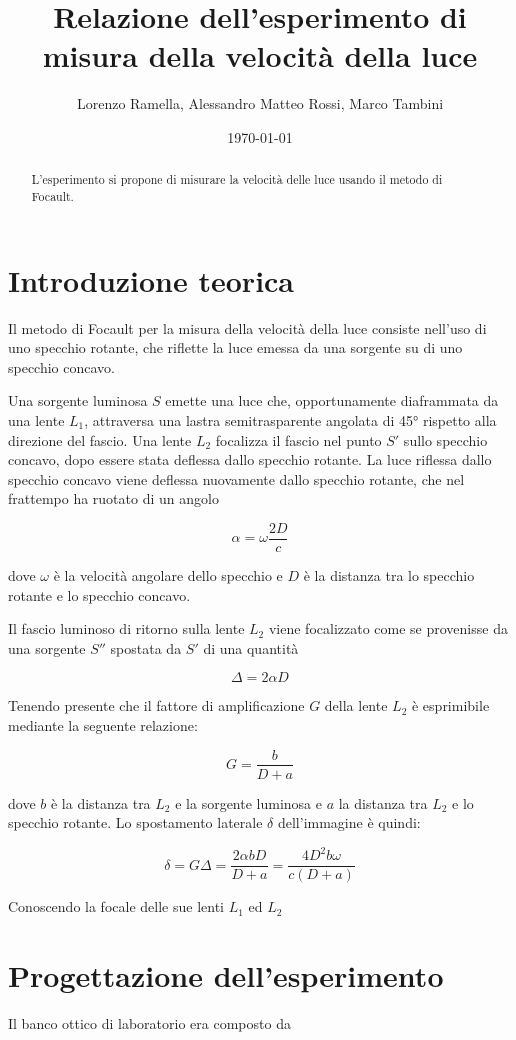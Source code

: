 \documentclass{article}
\title{Relazione dell'esperimento di misura della velocità della luce}
\author{Lorenzo Ramella, Alessandro Matteo Rossi, Marco Tambini}
\date{\today}
\begin{document}
\maketitle

\begin{abstract}
L’esperimento si propone di misurare la velocità delle luce usando il metodo di Focault. 
\end{abstract}
\tableofcontents

\section{Introduzione teorica}
Il metodo di Focault per la misura della velocità della luce consiste nell'uso di uno specchio rotante, che riflette la luce emessa da una sorgente su di uno specchio concavo. 

Una sorgente luminosa $S$ emette una luce che, opportunamente diaframmata da una lente $L_1$, attraversa una lastra semitrasparente angolata di 45° rispetto alla direzione del fascio. Una lente $L_2$ focalizza il fascio nel punto $S'$ sullo specchio concavo, dopo essere stata deflessa dallo specchio rotante. La luce riflessa dallo specchio concavo viene deflessa nuovamente dallo specchio rotante, che nel frattempo ha ruotato di un angolo 

\[\alpha = \omega \frac{2D}{c}\]

dove $\omega$ è la velocità angolare dello specchio e $D$ è la distanza tra lo specchio rotante e lo specchio concavo.

Il fascio luminoso di ritorno sulla lente $L_2$ viene focalizzato come se provenisse da una sorgente $S''$ spostata da $S'$ di una quantità 

\[\Delta = 2 \alpha D\] 

Tenendo presente che il fattore di amplificazione $G$ della lente $L_2$ è esprimibile mediante la seguente relazione:

\[G=\frac{b}{D+a}\]

dove $b$ è la distanza tra $L_2$ e la sorgente luminosa e $a$  la distanza tra $L_2$ e lo specchio rotante. Lo spostamento laterale $\delta$ dell'immagine è quindi:

\[\delta = G\Delta =\frac{2\alpha b D}{D + a}=\frac{4 D^2 b \omega}{c(D+a)}\]

Conoscendo la focale delle sue lenti $L_1$ ed $L_2$

\section{Progettazione dell'esperimento}
Il banco ottico di laboratorio era composto da 
\end{document}
